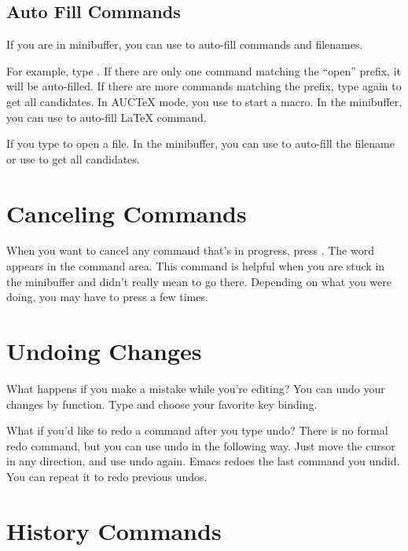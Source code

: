 \subsection{Auto Fill Commands}
\label{sec:auto-fill-commands}
If you are in minibuffer, you can use  to auto-fill commands and filenames.

For example, type . If there are only one command matching the ``open'' prefix, it will be auto-filled.
If there are more commands matching the prefix, type  again to get all candidates. In AUCTeX mode, you use  to start a macro.
In the minibuffer, you can use  to auto-fill \LaTeX{}\xspace command.

If you type  to open a file. In the minibuffer, you can use  to auto-fill the filename or use  to get all candidates.



\section{Canceling Commands}
\label{sec:canceling-commands}

When you want to cancel any command that’s in progress, press .
The word  appears in the command area.
This command is helpful when you are stuck in the minibuffer and didn’t really mean to go there.
Depending on what you were doing, you may have to press  a few times.


\section{Undoing Changes}
\label{sec:undoing-changes}

What happens if you make a mistake while you’re editing? You can undo your changes by  function.
Type  and choose your favorite key binding.


What if you’d like to redo a command after you type undo?
There is no formal redo command, but you can use undo in the following way.
Just move the cursor in any direction, and use undo again.
Emacs redoes the last command you undid.
You can repeat it to redo previous undos.


\section{History Commands}
\label{sec:history-commands}

